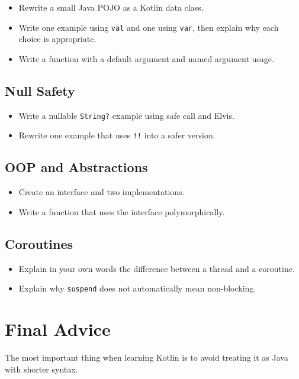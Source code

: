 \documentclass[11pt,a4paper]{article}
\begin{document}
\begin{itemize}
    \item Rewrite a small Java POJO as a Kotlin data class.
    \item Write one example using \texttt{val} and one using \texttt{var}, then explain why each choice is appropriate.
    \item Write a function with a default argument and named argument usage.
\end{itemize}

\subsection{Null Safety}

\begin{itemize}
    \item Write a nullable \texttt{String?} example using safe call and Elvis.
    \item Rewrite one example that uses \texttt{!!} into a safer version.
\end{itemize}

\subsection{OOP and Abstractions}

\begin{itemize}
    \item Create an interface and two implementations.
    \item Write a function that uses the interface polymorphically.
\end{itemize}

\subsection{Coroutines}

\begin{itemize}
    \item Explain in your own words the difference between a thread and a coroutine.
    \item Explain why \texttt{suspend} does not automatically mean non-blocking.
\end{itemize}

\section{Final Advice}

The most important thing when learning Kotlin is to avoid treating it as Java with shorter syntax.
\end{document}
